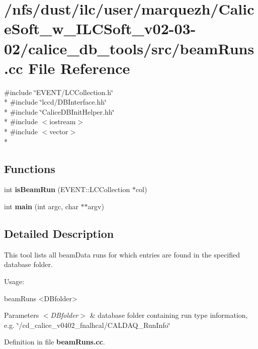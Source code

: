 \section{/nfs/dust/ilc/user/marquezh/\-Calice\-Soft\-\_\-w\-\_\-\-I\-L\-C\-Soft\-\_\-v02-\/03-\/02/calice\-\_\-db\-\_\-tools/src/beam\-Runs.cc File Reference}
\label{beamRuns_8cc}
{\ttfamily \#include \char`\"{}E\-V\-E\-N\-T/\-L\-C\-Collection.\-h\char`\"{}}\\*
{\ttfamily \#include \char`\"{}lccd/\-D\-B\-Interface.\-hh\char`\"{}}\\*
{\ttfamily \#include \char`\"{}Calice\-D\-B\-Init\-Helper.\-hh\char`\"{}}\\*
{\ttfamily \#include $<$iostream$>$}\\*
{\ttfamily \#include $<$vector$>$}\\*
\subsection*{Functions}
\begin{DoxyCompactItemize}
\item 
int {\bfseries is\-Beam\-Run} (E\-V\-E\-N\-T\-::\-L\-C\-Collection $\ast$col)\label{beamRuns_8cc_a20800a10ee55c5b6682f682449301867}

\item 
int {\bfseries main} (int argc, char $\ast$$\ast$argv)\label{beamRuns_8cc_a3c04138a5bfe5d72780bb7e82a18e627}

\end{DoxyCompactItemize}


\subsection{Detailed Description}
This tool lists all beam\-Data runs for which entries are found in the specified database folder.

Usage\-:


\begin{DoxyCode}
beamRuns <DBfolder>
\end{DoxyCode}



\begin{DoxyParams}{Parameters}
{\em $<$\-D\-Bfolder$>$} & database folder containing run type information, e.\-g. \char`\"{}/cd\-\_\-calice\-\_\-v0402\-\_\-fnalhcal/\-C\-A\-L\-D\-A\-Q\-\_\-\-Run\-Info\char`\"{} \\
\hline
\end{DoxyParams}


Definition in file {\bf beam\-Runs.\-cc}.

